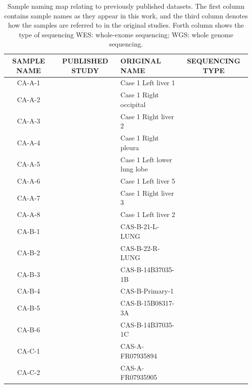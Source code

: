 \begin{table}[!ht]
\caption[Sample name mapping]{Sample naming map relating to previously published datasets. The first column contains sample names as they appear in this work, and the third column denotes how the samples are referred to in the original studies. Forth column shows the type of sequencing WES: whole-exome sequencing; WGS: whole genome sequencing.}\label{A:tab:S1}
\centering
\footnotesize
{}
\begin{tabular}{c|c|l|c}
\toprule
\textbf{SAMPLE NAME} & \textbf{PUBLISHED STUDY} & \textbf{ORIGINAL NAME} & \textbf{SEQUENCING TYPE} \\
\midrule
CA-A-1	&  \cellcolor{white} & Case 1 Left liver 1	& \cellcolor{green!9}\\
CA-A-2	& \cellcolor{white} &	Case 1 Right occipital & \cellcolor{green!9}\\
CA-A-3	& \cellcolor{white} &	Case 1 Right liver 2	 & \cellcolor{green!9}\\
CA-A-4	& \cellcolor{white} &	Case 1 Right pleura	 & \cellcolor{green!9}\\
CA-A-5	& \cellcolor{white} &	Case 1 Left lower lung lobe	 & \cellcolor{green!9}\\
CA-A-6	& \cellcolor{white} &	Case 1 Left liver 5	 & \cellcolor{green!9}\\
 CA-A-7	& \cellcolor{white} &	Case 1 Right liver 3	 & \cellcolor{green!9}\\
CA-A-8	& \cellcolor{white} \multirow{-8}{*}{\citeauthor*{Solomon2020} \cite{Solomon2020}} &	Case 1 Left liver 2	 &  \cellcolor{green!9}\multirow{-8}{*}{WGS}\\
\hhline{-|-|-|-}
CA-B-1 &  \cellcolor{white} &CAS-B-21-L-LUNG & \cellcolor{blue!9}\\ 
CA-B-2 &  \cellcolor{white} &CAS-B-22-R-LUNG	& \cellcolor{blue!9} \\ 
CA-B-3 &  \cellcolor{white} &CAS-B-14B37035-1B & \cellcolor{blue!9} \\ 
CA-B-4 &  \cellcolor{white} &CAS-B-Primary-1 & \cellcolor{blue!9} \\ 
CA-B-5 &  \cellcolor{white} &CAS-B-15B08317-3A & \cellcolor{blue!9} \\ 
CA-B-6 &  \cellcolor{white} &CAS-B-14B37035-1C & \cellcolor{blue!9}\multirow{-6}{*}{WES} \\ 
\hhline{-|~|-|-}
CA-C-1 &  \cellcolor{white} &CAS-A-FR07935894 & \cellcolor{green!9} \\ 
CA-C-2 &  \cellcolor{white} &CAS-A-FR07935905 & \cellcolor{green!9} \\ 

\end{tabular}
\end{table}
